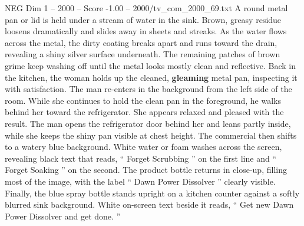\begin{textsample}{NEG Dim 1 – 2000 – Score -1.00 – 2000/tv\_com\_2000\_69.txt}
A round metal pan or lid is held under a stream of water in the sink.
Brown, greasy residue loosens dramatically and slides away in sheets and streaks.
As the water flows across the metal, the dirty coating breaks apart and runs toward the drain, revealing a shiny silver surface underneath.
The remaining patches of brown grime keep washing off until the metal looks mostly clean and reflective.
Back in the kitchen, the woman holds up the cleaned, \textbf{gleaming} metal pan, inspecting it with satisfaction.
The man re-enters in the background from the left side of the room.
While she continues to hold the clean pan in the foreground, he walks behind her toward the refrigerator.
She appears relaxed and pleased with the result.
The man opens the refrigerator door behind her and leans partly inside, while she keeps the shiny pan visible at chest height.
The commercial then shifts to a watery blue background.
White water or foam washes across the screen, revealing black text that reads, “ Forget Scrubbing ” on the first line and “ Forget Soaking ” on the second.
The product bottle returns in close-up, filling most of the image, with the label “ Dawn Power Dissolver ” clearly visible.
Finally, the blue spray bottle stands upright on a kitchen counter against a softly blurred sink background.
White on-screen text beside it reads, “ Get new Dawn Power Dissolver and get done. ”

\end{textsample}
